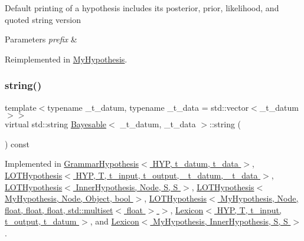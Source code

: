 Default printing of a hypothesis includes its posterior, prior, likelihood, and quoted string version 
\begin{DoxyParams}{Parameters}
{\em prefix} & \\
\hline
\end{DoxyParams}


Reimplemented in \hyperlink{class_my_hypothesis_a91fd22a2724e04c0e7c67ea4282beac4}{My\+Hypothesis}.

\mbox{\label{class_bayesable_a2ec58e98bf37a90ac3d45a7713c6d5ea}} 
\subsubsection{\texorpdfstring{string()}{string()}}
{\footnotesize\ttfamily template$<$typename \+\_\+t\+\_\+datum, typename \+\_\+t\+\_\+data = std\+::vector$<$\+\_\+t\+\_\+datum$>$$>$ \\
virtual std\+::string \hyperlink{class_bayesable}{Bayesable}$<$ \+\_\+t\+\_\+datum, \+\_\+t\+\_\+data $>$\+::string (\begin{DoxyParamCaption}{ }\end{DoxyParamCaption}) const\hspace{0.3cm}{\ttfamily [pure virtual]}}



Implemented in \hyperlink{class_grammar_hypothesis_a75267d7b68cd9b3634f84a464877c07c}{Grammar\+Hypothesis$<$ H\+Y\+P, t\+\_\+datum, t\+\_\+data $>$}, \hyperlink{class_l_o_t_hypothesis_a5c91fd3b7ef4ebc585413d723cd17e7e}{L\+O\+T\+Hypothesis$<$ H\+Y\+P, T, t\+\_\+input, t\+\_\+output, \+\_\+t\+\_\+datum, \+\_\+t\+\_\+data $>$}, \hyperlink{class_l_o_t_hypothesis_a5c91fd3b7ef4ebc585413d723cd17e7e}{L\+O\+T\+Hypothesis$<$ Inner\+Hypothesis, Node, S, S $>$}, \hyperlink{class_l_o_t_hypothesis_a5c91fd3b7ef4ebc585413d723cd17e7e}{L\+O\+T\+Hypothesis$<$ My\+Hypothesis, Node, Object, bool $>$}, \hyperlink{class_l_o_t_hypothesis_a5c91fd3b7ef4ebc585413d723cd17e7e}{L\+O\+T\+Hypothesis$<$ My\+Hypothesis, Node, float, float, float, std\+::multiset$<$ float $>$ $>$}, \hyperlink{class_lexicon_aad37474da522d811415c1ba45ca72dff}{Lexicon$<$ H\+Y\+P, T, t\+\_\+input, t\+\_\+output, t\+\_\+datum $>$}, and \hyperlink{class_lexicon_aad37474da522d811415c1ba45ca72dff}{Lexicon$<$ My\+Hypothesis, Inner\+Hypothesis, S, S $>$}.



